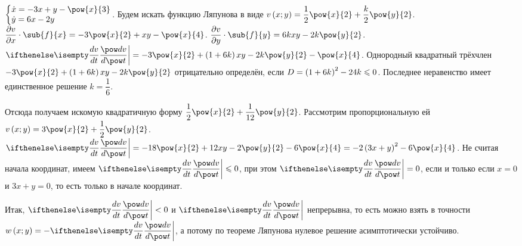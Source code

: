 \documentclass[a5paper,10pt]{article}
\begin{document}
$\tsys{\dot{x} = -3x + y - \pow{x}{3} \\ \dot{y} = 6x - 2y}$.
Будем искать функцию Ляпунова в виде 
$v\br{x; y} = \dfrac {1} {2} \pow{x}{2} + \dfrac {k} {2} \pow{y}{2}$.
$\parder{v}{x} \cdot \sub{f}{x} = -3\pow{x}{2} + xy - \pow{x}{4}$.
$\parder{v}{y} \cdot \sub{f}{y} = 6kxy - 2k\pow{y}{2}$.
$\der{v}{t}\bigg| = -3\pow{x}{2} + \br{1 + 6k} xy - 2k\pow{y}{2} - \pow{x}{4}$.
Однородный квадратный трёхчлен 
$-3\pow{x}{2} + \br{1 + 6k} xy - 2k\pow{y}{2}$
отрицательно определён, если $D = \left(\hspace{0.01em}1 + 6k\hspace{0.01em}\right)^2 - 24k \leqslant 0$. 
Последнее неравенство имеет единственное решение $k = \dfrac {1} {6}$.

Отсюда получаем искомую квадратичную форму 
$\dfrac {1} {2} \pow{x}{2} + \dfrac {1} {12} \pow{y}{2} $. 
Рассмотрим пропорциональную ей 
$v\br{x; y} = 3\pow{x}{2} + \dfrac {1} {2}\pow{y}{2}$. 
$\der{v}{t}\bigg| 
    = -18 \pow{x}{2} + 12 xy - 2\pow{y}{2} - 6\pow{x}{4} 
    = -2 \br{3x + y}^2 - 6\pow{x}{4}$.
Не считая начала координат, имеем $\der{v}{t}\bigg| \le 0$,
при этом $\der{v}{t}\bigg| = 0$, если и только если 
$x = 0$ и $3x + y = 0$, то есть только в начале координат.

Итак, $\der{v}{t}\bigg| < 0$ и $\der{v}{t}\bigg|$
непрерывна, то есть можно взять в точности 
$w\br{x; y} = -\der{v}{t}\bigg|$,
а потому по теореме Ляпунова нулевое решение асимптотически устойчиво.
\end{document}
